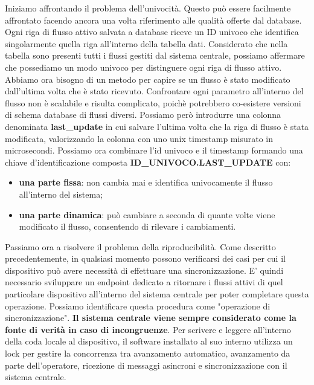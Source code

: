 \documentclass[a4paper, titlepage, 12pt, openright, oneside]{book}
\begin{document}
Iniziamo affrontando il problema dell'univocità. Questo può essere facilmente affrontato facendo ancora una volta riferimento alle qualità offerte dal database. Ogni riga di flusso attivo salvata a database riceve un ID univoco che identifica singolarmente quella riga all'interno della tabella dati. Considerato che nella tabella sono presenti tutti i flussi gestiti dal sistema centrale, possiamo affermare che possediamo un modo univoco per distinguere ogni riga di flusso attivo.
\newline
Abbiamo ora bisogno di un metodo per capire se un flusso è stato modificato dall'ultima volta che è stato ricevuto. Confrontare ogni parametro all'interno del flusso non è scalabile e risulta complicato, poichè potrebbero co-esistere versioni di schema database di flussi diversi. Possiamo però introdurre una colonna denominata \textbf{last\_update} in cui salvare l'ultima volta che la riga di flusso è stata modificata, valorizzando la colonna con uno unix timestamp misurato in microsecondi.
\newline
Possiamo ora combinare l'id univoco e il timestamp formando una chiave d'identificazione composta \textbf{ID\_UNIVOCO.LAST\_UPDATE} con:
\begin{itemize}
	\item \textbf{una parte fissa}: non cambia mai e identifica univocamente il flusso all'interno del sistema;
	\item \textbf{una parte dinamica}: può cambiare a seconda di quante volte viene modificato il flusso, consentendo di rilevare i cambiamenti.
\end{itemize}
Passiamo ora a risolvere il problema della riproducibilità. Come descritto precedentemente, in qualsiasi momento possono verificarsi dei casi per cui il dispositivo può avere necessità di effettuare una sincronizzazione. E' quindi necessario sviluppare un endpoint dedicato a ritornare i flussi attivi di quel particolare dispositivo all'interno del sistema centrale per poter completare questa operazione. Possiamo identificare questa procedura come "operazione di sincronizzazione". \textbf{Il sistema centrale viene sempre considerato come la fonte di verità in caso di incongruenze}. Per scrivere e leggere all'interno della coda locale al dispositivo, il software installato al suo interno utilizza un lock per gestire la concorrenza tra avanzamento automatico, avanzamento da parte dell'operatore, ricezione di messaggi asincroni e sincronizzazione con il sistema centrale.
\end{document}
